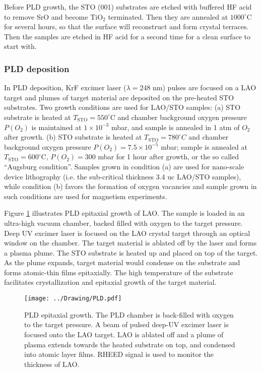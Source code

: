 \documentclass[pdftex, sectionletters]{pittetd}    %
\begin{document}
Before PLD growth, the STO (001) substrates are etched with buffered HF acid to remove SrO and become TiO$_2$ terminated. Then they are annealed at $1000^{\circ}$C for several hours, so that the surface will reconstruct and form crystal terraces\cite{}. Then the samples are etched in HF acid for a second time for a clean surface to start with. 

\subsubsection{PLD deposition}

In PLD deposition, KrF excimer laser ($\lambda = 248$ nm) pulses are focused on a LAO target and plumes of target material are deposited on the pre-heated STO substrates. Two growth conditions are used for LAO/STO samples: (a) STO substrate is heated at $T_\mathrm{STO} = 550^{\circ}$C and chamber background oxygen pressure $P(O_2)$ is maintained at $1 \times 10^{-3}$ mbar, and sample is annealed in 1 atm of $O_2$ after growth. (b) STO substrate is heated at $T_\mathrm{STO} = 780^{\circ}C$ and chamber background oxygen pressure $P(O_2) = 7.5 \times 10^{-5}$ mbar; sample is annealed at $T_\mathrm{STO} = 600^{\circ}$C, $P(O_2) = 300$ mbar for 1 hour after growth, or the so called ``Augsburg condition''. Samples grown in condition (a) are used for nano-scale device lithography (i.e. the sub-critical thickness 3.4 uc LAO/STO samples), while condition (b) favors the formation of oxygen vacancies and sample grown in such conditions are used for magnetism experiments\cite{}. 

Figure \ref{FIG:PLD} illustrates PLD epitaxial growth of LAO. The sample is loaded in an ultra-high vacuum chamber, backed filled with oxygen to the target pressure. Deep UV excimer laser is focused on the LAO crystal target through an optical window on the chamber. The target material is ablated off by the laser and forms a plasma plume. The STO substrate is heated up and placed on top of the target. As the plume expands, target material would condense on the substrate and forms atomic-thin films epitaxially. The high temperature of the substrate facilitates crystallization and epitaxial growth of the target material. 

\begin{figure}[hp!]
	\centering
	\texttt{[image: ../Drawing/PLD.pdf]}
	\caption{PLD epitaxial growth. The PLD chamber is back-filled with oxygen to the target pressure. A beam of pulsed deep-UV excimer laser is focused onto the LAO target. LAO is ablated off and a plume of plasma extends towards the heated substrate on top, and condensed into atomic layer films. RHEED signal is used to monitor the thickness of LAO.}
	\label{FIG:PLD}
\end{figure}
\end{document}
